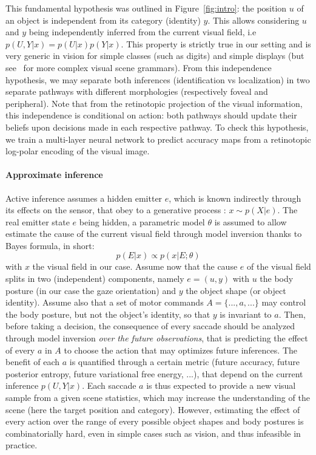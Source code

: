 This fundamental hypothesis was outlined in Figure~\ref{fig:intro}: the position $u$ of an object is independent from its category (identity) $y$.  This allows considering $u$ and $y$ being independently inferred from the current visual field, i.e $p(U,Y|x) = p(U|x) p(Y|x)$. This property is strictly true in our setting and is very generic in vision for simple classes (such as digits) and simple displays (but see~\citep{Vo12} for more complex visual scene grammars). 
From this independence hypothesis, we may separate both inferences (identification vs localization) in two separate pathways with different morphologies (respectively foveal and peripheral). Note that from the retinotopic projection of the visual information, this independence is conditional on action: both pathways should update their beliefs upon decisions made in each respective pathway.
To check this hypothesis, we train a multi-layer neural network to predict accuracy maps from a retinotopic log-polar encoding of the visual image. 


\paragraph{Approximate inference}
Active inference assumes a hidden emitter $e$, which is known indirectly through its effects on the sensor, that obey to a generative process : $x\sim p(X|e)$. The real emitter state $e$ being hidden, a parametric model $\theta$ is assumed to allow estimate the cause of the current visual field through model inversion thanks to Bayes formula, in short:
$$p(E|x) \propto p(x|E;\theta)$$
with $x$ the visual field in our case. Assume now that the cause $e$ of the visual field splits in two (independent) components, namely $e = (u,y)$ with $u$ the body posture (in our case the gaze orientation) and $y$ the object shape (or object identity). Assume also that a set of motor commands $A = \{..., a, ...\}$ may control the body posture, but not the object's identity, so that $y$ is invariant to $a$.
Then, before taking a decision, the consequence of every saccade should be analyzed  through model inversion \emph{over the future observations}, that is predicting the effect of every $a$ in $A$ to choose the action that may optimizes future inferences. The benefit of each $a$ is quantified through a certain metric (future accuracy, future posterior entropy, future variational free energy, ...), that depend on the current inference $p(U,Y|x)$. Each saccade $a$ is thus expected to provide a new visual sample from a given scene statistics, which may increase the understanding of the scene (here the target position and category). However, estimating the effect of every action over the range of every possible object shapes and body postures is combinatorially hard, even in simple cases such as vision, and thus infeasible in practice. 





